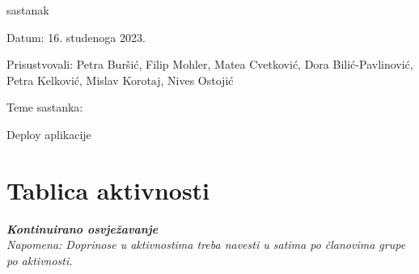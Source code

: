 \begin{packed_enum}
				\item  sastanak
			\item[] \begin{packed_item}
				\item Datum: 16. studenoga 2023.
				\item Prisustvovali: Petra Buršić, Filip Mohler, Matea Cvetković, Dora Bilić-Pavlinović, Petra Kelković, Mislav Korotaj, Nives Ostojić
				\item Teme sastanka:
				\begin{packed_item}
					\item  Deploy aplikacije
				\end{packed_item}
			\end{packed_item}
			
			
		\end{packed_enum}
		
		\eject
		\section*{Tablica aktivnosti}
		
			\textbf{\textit{Kontinuirano osvježavanje}}\\
			
			 \textit{Napomena: Doprinose u aktivnostima treba navesti u satima po članovima grupe po aktivnosti.}

